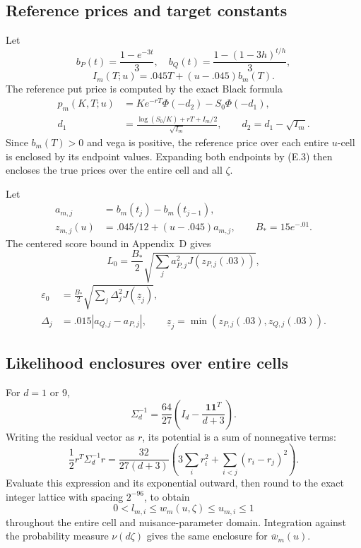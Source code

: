 \subsection{Reference prices and target constants}

Let
\[
b_P(t)=\frac{1-e^{-3t}}3,\quad
b_Q(t)=\frac{1-(1-3h)^{t/h}}3,
\]
\[
I_m(T;u)=.045T+(u-.045)b_m(T).
\]
The reference put price is computed by the exact Black formula
\[
\begin{aligned}
p_m(K,T;u)&=Ke^{-rT}\Phi(-d_2)-S_0\Phi(-d_1),\\
d_1&=\frac{\log(S_0/K)+rT+I_m/2}{\sqrt{I_m}},\qquad
d_2=d_1-\sqrt{I_m}.
\end{aligned}
\tag{F.2}
\]
Since \(b_m(T)>0\) and vega is positive, the reference price over each entire
\(u\)-cell is enclosed by its endpoint values.
Expanding both endpoints by (E.3) then encloses the true prices over the entire cell
and all \(\zeta\).

Let
\[
\begin{aligned}
a_{m,j}&=b_m(t_j)-b_m(t_{j-1}),\\
z_{m,j}(u)&=.045/12+(u-.045)a_{m,j},\qquad B_*=15e^{-.01}.
\end{aligned}
\]
The centered score bound in Appendix~D gives
\[
L_0=\frac{B_*}2
\sqrt{\sum_ja_{P,j}^2J(z_{P,j}(.03))},
\]
\[
\begin{aligned}
\varepsilon_0&=\frac{B_*}2
\sqrt{\sum_j\Delta_j^2J(\underline z_j)},\\
\Delta_j&=.015|a_{Q,j}-a_{P,j}|,\qquad
\underline z_j=\min(z_{P,j}(.03),z_{Q,j}(.03)).
\end{aligned}
\tag{F.3}
\]

\subsection{Likelihood enclosures over entire cells}

For \(d=1\) or 9,
\[
\Sigma_d^{-1}=\frac{64}{27}\left(I_d-\frac{\mathbf1\mathbf1^T}{d+3}\right).
\]
Writing the residual vector as \(r\), its potential is a sum of nonnegative terms:
\[
\frac12r^T\Sigma_d^{-1}r=
\frac{32}{27(d+3)}
\left(3\sum_i r_i^2+\sum_{i<j}(r_i-r_j)^2\right).
\tag{F.4}
\]
Evaluate this expression and its exponential outward, then round to the exact integer
lattice with spacing \(2^{-96}\), to obtain
\[
0<l_{m,i}\le w_m(u,\zeta)\le u_{m,i}\le1
\]
throughout the entire cell and nuisance-parameter domain.
Integration against the probability measure \(\nu(d\zeta)\) gives the same enclosure
for \(\bar w_m(u)\).

